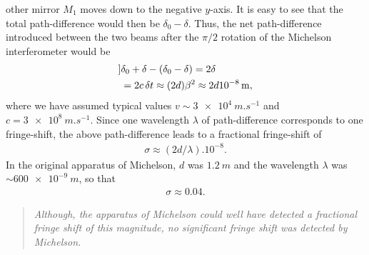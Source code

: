 other mirror $M_1$ moves down to the negative $y$-axis. It 
is easy to see that the total path-difference would then be 
$\delta_0-\delta$. Thus, the net path-difference introduced
between the two beams after the $\pi/2$ rotation of the 
Michelson interferometer would be
\begin{align}]\label{sav.5}
&\delta_0+\delta -(\delta_0-\delta) = 2\delta 
\notag\\&=2c\,\delta t
\approx (2d) \beta^2 \approx 2d\SI{e-8}{m},
\end{align}
where we have assumed  typical  values $v\sim\SI{3e4}{m. 
s^{-1} }$ and $c =\SI{3e8}{m.s^{-1}}$. Since one wavelength 
$ \lambda$ of path-difference corresponds to one 
fringe-shift, the above path-difference leads to a 
fractional fringe-shift of
\begin{align}\label{sav.6}
\sigma \approx (2d/\lambda) .10^{-8}.
\end{align}
In the original apparatus of Michelson, $d$ was 
$\SI{1.2}{m}$ and the wavelength $ \lambda$ was $ 
\sim\SI{600 e-9} {m}$, so that
\begin{align}\label{sav.7}
\sigma\approx  0.04.
\end{align}
\begin{quote}
\textsl{Although, the apparatus of Michelson could well 
have detected a fractional fringe shift of this magnitude, 
no significant fringe shift was detected by Michelson.}
\end{quote}

